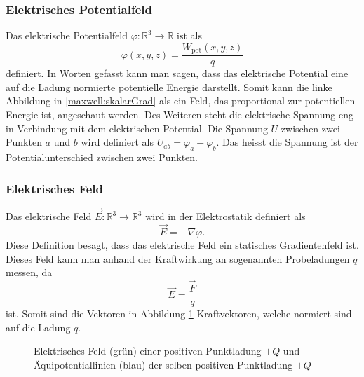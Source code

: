 \subsubsection{Elektrisches Potentialfeld}
Das elektrische Potentialfeld
\(
\varphi:\mathbb{R}^3
\rightarrow
\mathbb{R}
\)
ist als
\begin{equation}
	\varphi(x,y,z)
	=
	\frac{W_{\text{pot}}(x,y,z)}{q}
	\label{maxwell:section:definition_elektrischespotentialfeld}
\end{equation}
definiert.
In Worten gefasst kann man sagen, dass das elektrische Potential eine auf die Ladung normierte potentielle Energie darstellt.
Somit kann die linke Abbildung in \ref{maxwell:skalarGrad} als ein Feld, das proportional zur potentiellen Energie ist, angeschaut werden.
Des Weiteren steht die elektrische Spannung eng in Verbindung mit dem elektrischen Potential.
Die Spannung $U$ zwischen zwei Punkten $a$ und $b$ wird definiert als
\(
U_{ab}
=
\varphi_a - \varphi_b.
\)
Das heisst die Spannung ist der Potentialunterschied zwischen zwei Punkten.

\subsubsection{Elektrisches Feld}
Das elektrische Feld
\(
\vec{E}:\mathbb{R}^3 \rightarrow \mathbb{R}^3
\)
wird in der Elektrostatik definiert als
\begin{equation}
	\vec{E}
	=
	- \nabla\varphi.
	\label{maxwell:section:definition_statisch_elektrischesFeld}
\end{equation}
Diese Definition besagt, dass das elektrische Feld ein statisches Gradientenfeld ist.
Dieses Feld kann man anhand der Kraftwirkung an sogenannten Probeladungen $q$ messen, da
\[
\vec{E}
=
\frac{\vec{F}}{q}
\]
ist.
Somit sind die Vektoren in Abbildung \ref{maxwell:section:E-Feld_punktladung} Kraftvektoren, welche normiert sind auf die Ladung $q$.
\begin{figure}
	\centering
	\caption{Elektrisches Feld (grün) einer positiven Punktladung $+Q$ und Äquipotentiallinien (blau) der selben positiven Punktladung $+Q$}
	\label{maxwell:section:E-Feld_punktladung}
\end{figure}


